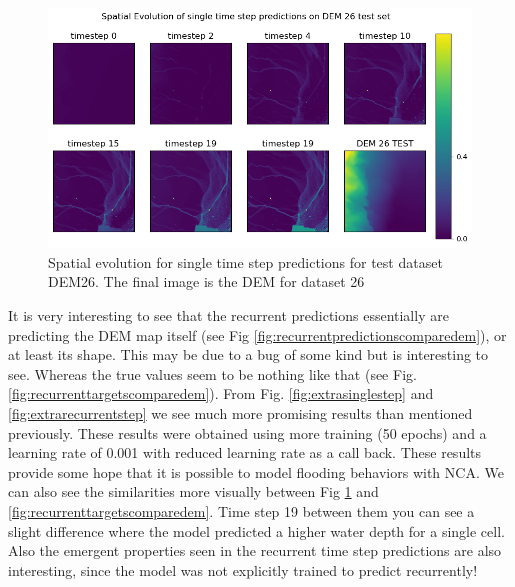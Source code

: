 \begin{figure}[tbph]
	\centering
	\includegraphics[width=0.8\linewidth, height=0.3\textheight]{Figures/Results/extra/SS_predictions_compare_dem}
	\caption[Spatial Evolution of Single Time Step predictions on test dataset DEM 26]{Spatial evolution for single time step predictions for test dataset DEM26. The final image is the DEM for dataset 26}
	\label{fig:sspredictionscomparedem}
\end{figure}


It is very  interesting to see that the recurrent predictions essentially are predicting the DEM map itself (see Fig \ref{fig:recurrentpredictionscomparedem}), or at  least its shape. This may be due to a bug of some kind but is interesting to see. Whereas the true values seem to be nothing like that (see Fig. \ref{fig:recurrenttargetscomparedem}). From Fig. \ref{fig:extrasinglestep} and \ref{fig:extrarecurrentstep} we see much more promising results than mentioned previously. These results were obtained using more training (50 epochs) and a learning rate of 0.001 with reduced learning rate as a call back. These results provide some hope that it is possible to model flooding behaviors with NCA. We can also see the similarities more visually between Fig \ref{fig:sspredictionscomparedem} and \ref{fig:recurrenttargetscomparedem}. Time step 19 between them you can see a slight difference where the model predicted a higher water depth for a single cell. Also the emergent properties seen in the recurrent time step predictions are also interesting, since the model was not explicitly trained to predict recurrently!